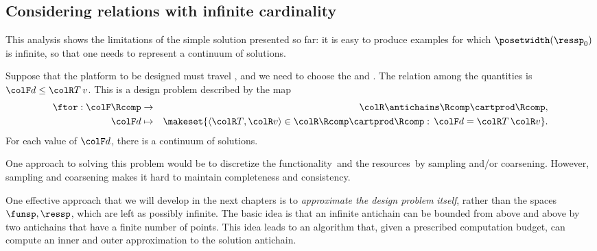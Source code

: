 \subsection{Considering relations with infinite cardinality}

This analysis shows the limitations of the simple solution presented so far: it is easy to produce examples for which $\posetwidth(\ressp_{0})$ is infinite, so that one needs to represent a continuum of solutions.

\begin{example}
    Suppose that the platform to be designed must travel , and we need to choose the  and .
    The relation among the quantities is~${\colF d}\leq{\colR T\,v}$.
    This is a design problem described by the map
    \begin{eqnarray*}
        \ftor:{\colF\Rcomp} & \rightarrow & {\colR\antichains\Rcomp\cartprod\Rcomp,}\\
        {\colF d} & \mapsto & \makeset{\langle{\colR T},{\colR v}\rangle\in{\colR\Rcomp\cartprod\Rcomp}:\,{\colF d}={\colR T}\,{\colR v}}.
    \end{eqnarray*}
    For each value of ${\colF d}$, there is a continuum of solutions.
\end{example}
One approach to solving this problem would be to discretize the functionality~\funsp and the resources~\ressp by sampling and/or coarsening.
However, sampling and coarsening makes it hard to maintain completeness and consistency.

One effective approach that we will develop in the next chapters is to \emph{approximate the design problem} \emph{itself}, rather than the spaces~$\funsp,\ressp$, which are left as possibly infinite.
The basic idea is that an infinite antichain can be bounded from above and above by two antichains that have a finite number of points.
This idea leads to an algorithm that, given a prescribed computation budget, can compute an inner and outer approximation to the solution antichain.

